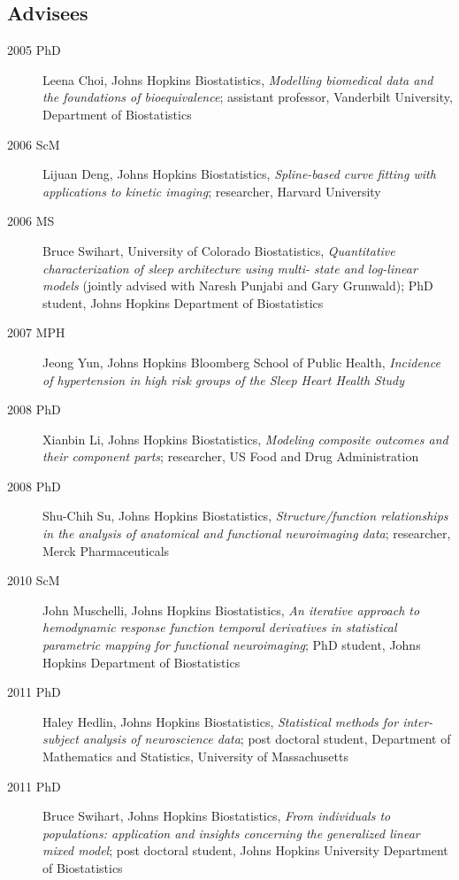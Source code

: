 \documentclass[12pt]{article}
\begin{document}
\subsection*{Advisees}
\begin{description}
\item[\textnormal{2005 PhD}] Leena Choi, Johns Hopkins Biostatistics, {\it Modelling biomedical data and the foundations of 
bioequivalence}; assistant professor, Vanderbilt University, Department of Biostatistics
\item[\textnormal{2006 ScM}] Lijuan Deng, Johns Hopkins Biostatistics, {\it Spline-based curve fitting with applications to 
kinetic imaging}; researcher, Harvard University
\item[\textnormal{2006 MS}] Bruce Swihart, University of Colorado
  Biostatistics, {\it Quantitative characterization of sleep
    architecture using multi- state and log-linear models} (jointly
  advised with Naresh Punjabi and Gary Grunwald); PhD student, Johns Hopkins Department of Biostatistics
\item[\textnormal{2007 MPH}] Jeong Yun, Johns Hopkins Bloomberg School of Public Health, {\it Incidence of hypertension in high risk groups of the Sleep Heart Health Study}
\item[\textnormal{2008 PhD}]  Xianbin Li, Johns Hopkins Biostatistics, {\it Modeling composite outcomes and their 
component parts}; researcher, US Food and Drug Administration
\item[\textnormal{2008 PhD}] Shu-Chih Su, Johns Hopkins Biostatistics, {\it Structure/function relationships in the analysis 
of anatomical and functional neuroimaging data}; researcher, Merck Pharmaceuticals
\item[\textnormal{2010 ScM}] John Muschelli, Johns Hopkins Biostatistics, {\it An iterative approach to hemodynamic response function temporal derivatives in statistical parametric mapping for functional neuroimaging}; PhD student, Johns Hopkins Department of Biostatistics
\item[\textnormal{2011 PhD}] Haley Hedlin, Johns Hopkins Biostatistics, {\it Statistical methods for inter-subject analysis of neuroscience data}; post doctoral student, Department of Mathematics and Statistics, University of Massachusetts
\item[\textnormal{2011 PhD}] Bruce Swihart, Johns Hopkins Biostatistics, {\it From individuals to populations:
application and insights concerning the generalized linear mixed model}; post doctoral student, Johns Hopkins University Department of Biostatistics

\end{description}
\end{document}
